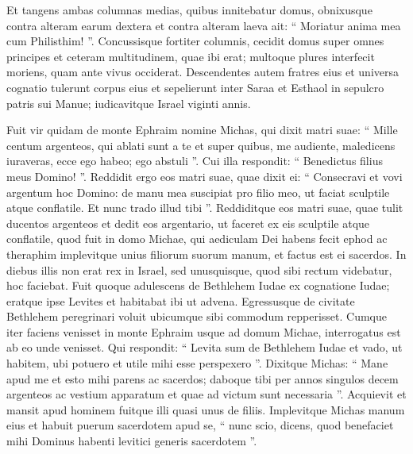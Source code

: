 \begin{biblechapter}
\begin{biblechapter}
\begin{biblechapter}
\begin{biblechapter}
\begin{biblechapter}
\begin{biblechapter}
\begin{biblechapter}
\begin{biblechapter}
\begin{biblechapter}
\begin{biblechapter}
\begin{biblechapter}
\begin{biblechapter}
\begin{biblechapter}
\begin{biblechapter}
\begin{biblechapter}
\begin{biblechapter}
\verse Et tangens ambas columnas medias, quibus innitebatur domus, obnixusque contra alteram earum dextera et contra alteram laeva 
\verse ait: “ Moriatur anima mea cum Philisthim! ”. Concussisque fortiter columnis, cecidit domus super omnes principes et ceteram multitudinem, quae ibi erat; multoque plures interfecit moriens, quam ante vivus occiderat. 
\verse Descendentes autem fratres eius et universa cognatio tulerunt corpus eius et sepelierunt inter Saraa et Esthaol in sepulcro patris sui Manue; iudicavitque Israel viginti annis.
 
\begin{biblechapter}
\verse Fuit vir quidam de monte Ephraim nomine Michas, 
\verse qui dixit matri suae: “ Mille centum argenteos, qui ablati sunt a te et super quibus, me audiente, maledicens iuraveras, ecce ego habeo; ego abstuli ”. Cui illa respondit: “ Benedictus filius meus Domino! ”. 
\verse Reddidit ergo eos matri suae, quae dixit ei: “ Consecravi et vovi argentum hoc Domino: de manu mea suscipiat pro filio meo, ut faciat sculptile atque conflatile. Et nunc trado illud tibi ”. 
\verse Reddiditque eos matri suae, quae tulit ducentos argenteos et dedit eos argentario, ut faceret ex eis sculptile atque conflatile, quod fuit in domo Michae, 
\verse qui aediculam Dei habens fecit ephod ac theraphim implevitque unius filiorum suorum manum, et factus est ei sacerdos. 
\verse In diebus illis non erat rex in Israel, sed unusquisque, quod sibi rectum videbatur, hoc faciebat. 
\verse Fuit quoque adulescens de Bethlehem Iudae ex cognatione Iudae; eratque ipse Levites et habitabat ibi ut advena. 
\verse Egressusque de civitate Bethlehem peregrinari voluit ubicumque sibi commodum repperisset. Cumque iter faciens venisset in monte Ephraim usque ad domum Michae, 
\verse interrogatus est ab eo unde venisset. Qui respondit: “ Levita sum de Bethlehem Iudae et vado, ut habitem, ubi potuero et utile mihi esse perspexero ”. 
\verse Dixitque Michas: “ Mane apud me et esto mihi parens ac sacerdos; daboque tibi per annos singulos decem argenteos ac vestium apparatum et quae ad victum sunt necessaria ”. 
\verse Acquievit et mansit apud hominem fuitque illi quasi unus de filiis. 
\verse Implevitque Michas manum eius et habuit puerum sacerdotem apud se, 
\verse “ nunc scio, dicens, quod benefaciet mihi Dominus habenti levitici generis sacerdotem ”.
 

\end{biblechapter}
\end{biblechapter}
\end{biblechapter}
\end{biblechapter}
\end{biblechapter}
\end{biblechapter}
\end{biblechapter}
\end{biblechapter}
\end{biblechapter}
\end{biblechapter}
\end{biblechapter}
\end{biblechapter}
\end{biblechapter}
\end{biblechapter}
\end{biblechapter}
\end{biblechapter}
\end{biblechapter}
